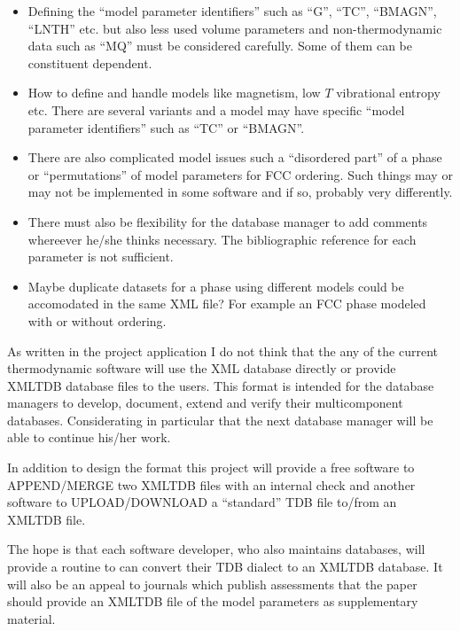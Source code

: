 \documentclass[12pt]{article}
\begin{document}
\begin{itemize}
\item Defining the ``model parameter identifiers'' such as ``G'',
  ``TC'', ``BMAGN'', ``LNTH'' etc. but also less used volume
  parameters and non-thermodynamic data such as ``MQ'' must be
  considered carefully.  Some of them can be constituent dependent.

\item How to define and handle models like magnetism, low $T$
  vibrational entropy etc.  There are several variants and a model may
  have specific ``model parameter identifiers'' such as ``TC'' or
  ``BMAGN''.

\item There are also complicated model issues such a ``disordered
  part'' of a phase or ``permutations'' of model parameters for FCC
  ordering.  Such things may or may not be implemented in some
  software and if so, probably very differently.

\item There must also be flexibility for the database manager to add
comments whereever he/she thinks necessary.  The bibliographic
reference for each parameter is not sufficient.

\item Maybe duplicate datasets for a phase using different models
  could be accomodated in the same XML file?  For example an FCC phase
  modeled with or without ordering.
\end{itemize}

As written in the project application I do not think that the any of
the current thermodynamic software will use the XML database directly
or provide XMLTDB database files to the users.  This format is
intended for the database managers to develop, document, extend and
verify their multicomponent databases.  Considerating in particular
that the next database manager will be able to continue his/her work.

In addition to design the format this project will provide a free
software to APPEND/MERGE two XMLTDB files with an internal check and
another software to UPLOAD/DOWNLOAD a ``standard'' TDB file to/from an
XMLTDB file.

The hope is that each software developer, who also maintains
databases, will provide a routine to can convert their TDB dialect to
an XMLTDB database.  It will also be an appeal to journals which
publish assessments that the paper should provide an XMLTDB file of
the model parameters as supplementary material.
\end{document}
